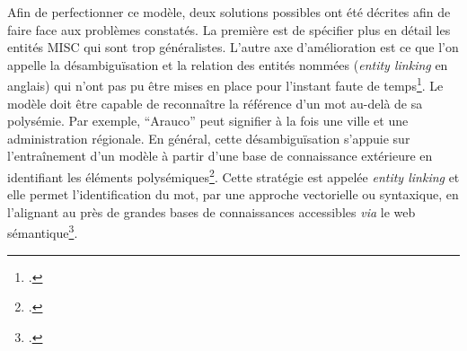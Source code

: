	Afin de perfectionner ce modèle, deux solutions possibles ont été décrites afin de faire face aux problèmes constatés. La première est de spécifier plus en détail les entités MISC qui sont trop généralistes. L'autre axe d'amélioration est ce que l'on appelle la désambiguïsation et la relation des entités nommées (\textit{entity linking} en anglais) qui n'ont pas pu être mises en place pour l'instant faute de temps\footcite{ehrmannNamedEntityRecognition2021}. Le modèle doit être capable de reconnaître la référence d'un mot au-delà de sa polysémie. Par exemple, \enquote{Arauco} peut signifier à la fois une ville et une administration régionale. En général, cette désambiguïsation s'appuie sur l'entraînement d'un modèle à partir d'une base de connaissance extérieure en identifiant les éléments polysémiques\footcite{bunescuUsingEncyclopedicKnowledge2006}. Cette stratégie est appelée \textit{entity linking} et elle permet l'identification  du mot, par une approche vectorielle ou syntaxique, en l'alignant au près de grandes bases de connaissances accessibles \textit{via} le web sémantique\footcite{morenoApprendreRepresentationsJointes2017}.
	
